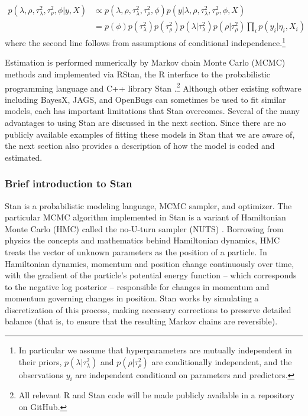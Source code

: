 {\singlespacing
\begin{align*}
p(\lambda, \rho, \tau^2_\lambda, \tau^2_\rho, \phi | y, X) & \propto p(\lambda, \rho, \tau^2_\lambda, \tau^2_\rho, \phi) p(y | \lambda, \rho, \tau^2_\lambda, \tau^2_\rho, \phi,  X)  \\
& = p(\phi) p(\tau^2_\lambda) p(\tau^2_\rho)  p(\lambda | \tau^2_\lambda) p(\rho | \tau^2_\rho) \prod_i p(y_i | \eta_i, X_i) 
\end{align*}
}
%
\noindent where the second line follows from assumptions of conditional independence.\footnote{In particular we assume that hyperparameters are mutually independent in their priors, $p(\lambda | \tau^2_\lambda)$ and $p(\rho | \tau^2_\rho)$ are conditionally independent, and the observations $y_i$ are independent conditional on parameters and predictors.}

Estimation is performed numerically by Markov chain Monte Carlo (MCMC) methods and implemented via RStan, the R interface to the probabilistic programming language and C++ library Stan .\footnote{All relevant R and Stan code will be made publicly available in a repository on GitHub.} Although other existing software including BayesX, JAGS, and OpenBugs can sometimes be used to fit similar models, each has important limitations that Stan overcomes. Several of the many advantages to using Stan are discussed in the next section. Since there are no publicly available examples of fitting these models in Stan that we are aware of, the next section also provides a description of how the model is coded and estimated. 

\subsubsection{Brief introduction to Stan}

Stan is a probabilistic modeling language, MCMC sampler, and optimizer. The particular MCMC algorithm implemented in Stan is a variant of Hamiltonian Monte Carlo (HMC) called the no-U-turn sampler (NUTS) . Borrowing from physics the concepts and mathematics behind Hamiltonian dynamics, HMC treats the vector of unknown parameters as the position of a particle. In Hamiltonian dynamics, momentum and position change continuously over time, with the gradient of the particle's potential energy function --  which corresponds to the negative log posterior -- responsible for changes in momentum and momentum governing changes in position. Stan works by simulating a discretization of this process, making necessary corrections to preserve detailed balance (that is, to ensure that the resulting Markov chains are reversible). 

